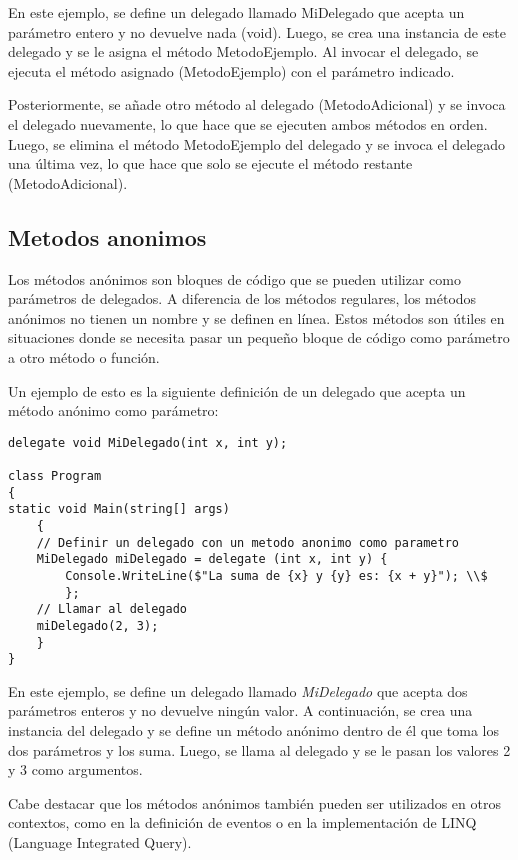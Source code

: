 \documentclass[executivepaper]{article}
\begin{document}
En este ejemplo, se define un delegado llamado MiDelegado que acepta un parámetro entero y no devuelve nada (void). Luego, se crea una instancia de este delegado y se le asigna el método MetodoEjemplo. Al invocar el delegado, se ejecuta el método asignado (MetodoEjemplo) con el parámetro indicado.

Posteriormente, se añade otro método al delegado (MetodoAdicional) y se invoca el delegado nuevamente, lo que hace que se ejecuten ambos métodos en orden. Luego, se elimina el método MetodoEjemplo del delegado y se invoca el delegado una última vez, lo que hace que solo se ejecute el método restante (MetodoAdicional).

\subsection{Metodos anonimos}

Los métodos anónimos son bloques de código que se pueden utilizar como parámetros de delegados. A diferencia de los métodos regulares, los métodos anónimos no tienen un nombre y se definen en línea. Estos métodos son útiles en situaciones donde se necesita pasar un pequeño bloque de código como parámetro a otro método o función.

Un ejemplo de esto es la siguiente definición de un delegado que acepta un método anónimo como parámetro:

\begin{lstlisting}
delegate void MiDelegado(int x, int y);

class Program
{
static void Main(string[] args)
    {
    // Definir un delegado con un metodo anonimo como parametro
    MiDelegado miDelegado = delegate (int x, int y) {
        Console.WriteLine($"La suma de {x} y {y} es: {x + y}"); \\$
        };
    // Llamar al delegado
    miDelegado(2, 3);
    }
}
\end{lstlisting}

En este ejemplo, se define un delegado llamado \emph{MiDelegado} que acepta dos parámetros enteros y no devuelve ningún valor. A continuación, se crea una instancia del delegado y se define un método anónimo dentro de él que toma los dos parámetros y los suma. Luego, se llama al delegado y se le pasan los valores 2 y 3 como argumentos.

Cabe destacar que los métodos anónimos también pueden ser utilizados en otros contextos, como en la definición de eventos o en la implementación de LINQ (Language Integrated Query).
\end{document}
